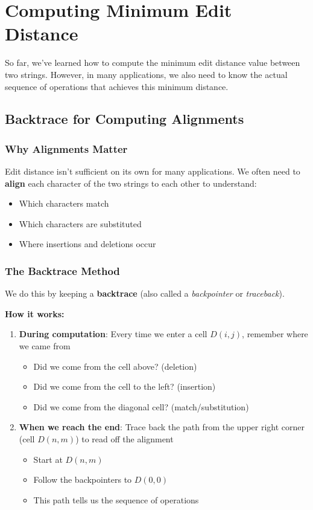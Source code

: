 \documentclass[11pt,a4paper]{article}
\theoremstyle{definition}
\theoremstyle{plain}
\theoremstyle{remark}
\begin{document}
\newpage
\section{Computing Minimum Edit Distance}

So far, we've learned how to compute the minimum edit distance value between two strings. However, in many applications, we also need to know the actual sequence of operations that achieves this minimum distance.

\subsection{Backtrace for Computing Alignments}

\subsubsection{Why Alignments Matter}

Edit distance isn't sufficient on its own for many applications. We often need to \textbf{align} each character of the two strings to each other to understand:
\begin{itemize}
    \item Which characters match
    \item Which characters are substituted
    \item Where insertions and deletions occur
\end{itemize}

\subsubsection{The Backtrace Method}

We do this by keeping a \textbf{backtrace} (also called a \textit{backpointer} or \textit{traceback}).

\textbf{How it works:}

\begin{enumerate}
    \item \textbf{During computation}: Every time we enter a cell $D(i,j)$, remember where we came from
    \begin{itemize}
        \item Did we come from the cell above? (deletion)
        \item Did we come from the cell to the left? (insertion)
        \item Did we come from the diagonal cell? (match/substitution)
    \end{itemize}
    
    \item \textbf{When we reach the end}: Trace back the path from the upper right corner (cell $D(n,m)$) to read off the alignment
    \begin{itemize}
        \item Start at $D(n,m)$
        \item Follow the backpointers to $D(0,0)$
        \item This path tells us the sequence of operations
    \end{itemize}
\end{enumerate}
\end{document}
